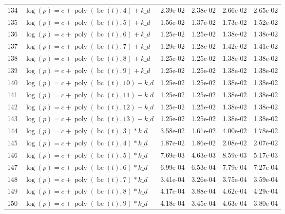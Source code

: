 \documentclass[12pt,a4paper]{article}
\DeclareMathOperator{\bc}{bc}
\DeclareMathOperator{\poly}{poly}
\begin{document}
\begin{longtable}[t]{ll>{\raggedleft\arraybackslash}p{2cm}>{\raggedleft\arraybackslash}p{2cm}>{\raggedleft\arraybackslash}p{2cm}>{\raggedleft\arraybackslash}p{2cm}}
134 & $\log(p) = c + \poly\left( \bc(t), 4 \right) + k\_d$ & 2.39e-02 & 2.38e-02 & 2.66e-02 & 2.65e-02\\
\rowcolor{gray!6}  135 & $\log(p) = c + \poly\left( \bc(t), 5 \right) + k\_d$ & 1.56e-02 & 1.37e-02 & 1.73e-02 & 1.52e-02\\
136 & $\log(p) = c + \poly\left( \bc(t), 6 \right) + k\_d$ & 1.25e-02 & 1.25e-02 & 1.38e-02 & 1.38e-02\\
\rowcolor{gray!6}  137 & $\log(p) = c + \poly\left( \bc(t), 7 \right) + k\_d$ & 1.29e-02 & 1.28e-02 & 1.42e-02 & 1.41e-02\\
138 & $\log(p) = c + \poly\left( \bc(t), 8 \right) + k\_d$ & 1.25e-02 & 1.25e-02 & 1.38e-02 & 1.38e-02\\
\rowcolor{gray!6}  139 & $\log(p) = c + \poly\left( \bc(t), 9 \right) + k\_d$ & 1.25e-02 & 1.25e-02 & 1.38e-02 & 1.38e-02\\
140 & $\log(p) = c + \poly\left( \bc(t), 10 \right) + k\_d$ & 1.25e-02 & 1.25e-02 & 1.38e-02 & 1.38e-02\\
\rowcolor{gray!6}  141 & $\log(p) = c + \poly\left( \bc(t), 11 \right) + k\_d$ & 1.25e-02 & 1.25e-02 & 1.38e-02 & 1.38e-02\\
142 & $\log(p) = c + \poly\left( \bc(t), 12 \right) + k\_d$ & 1.25e-02 & 1.25e-02 & 1.38e-02 & 1.38e-02\\
\rowcolor{gray!6}  143 & $\log(p) = c + \poly\left( \bc(t), 13 \right) + k\_d$ & 1.25e-02 & 1.25e-02 & 1.38e-02 & 1.38e-02\\
144 & $\log(p) = c + \poly\left( \bc(t), 3 \right) * k\_d$ & 3.58e-02 & 1.61e-02 & 4.00e-02 & 1.78e-02\\
\rowcolor{gray!6}  145 & $\log(p) = c + \poly\left( \bc(t), 4 \right) * k\_d$ & 1.87e-02 & 1.86e-02 & 2.08e-02 & 2.07e-02\\
146 & $\log(p) = c + \poly\left( \bc(t), 5 \right) * k\_d$ & 7.69e-03 & 4.63e-03 & 8.59e-03 & 5.17e-03\\
\rowcolor{gray!6}  147 & $\log(p) = c + \poly\left( \bc(t), 6 \right) * k\_d$ & 6.99e-04 & 6.53e-04 & 7.79e-04 & 7.27e-04\\
148 & $\log(p) = c + \poly\left( \bc(t), 7 \right) * k\_d$ & 3.41e-04 & 3.26e-04 & 3.75e-04 & 3.59e-04\\
\rowcolor{gray!6}  149 & $\log(p) = c + \poly\left( \bc(t), 8 \right) * k\_d$ & 4.17e-04 & 3.88e-04 & 4.62e-04 & 4.29e-04\\
150 & $\log(p) = c + \poly\left( \bc(t), 9 \right) * k\_d$ & 4.18e-04 & 3.45e-04 & 4.63e-04 & 3.80e-04\\

\end{longtable}
\end{document}

